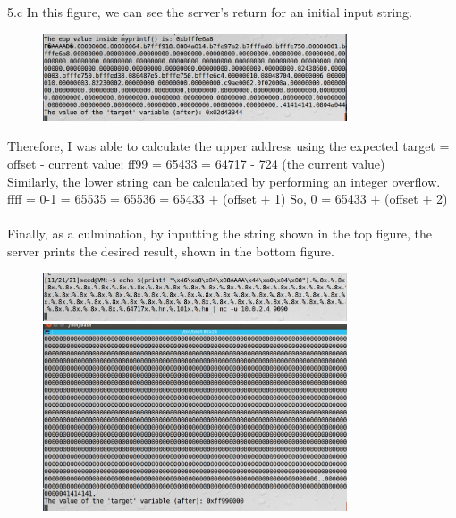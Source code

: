 \documentclass[12pt, a4paper]{article}
\begin{document}
\noindent
5.c
In this figure, we can see the server's return for an initial input string.
\begin{figure}[h!]
\centering
\includegraphics[width=90mm]{"Capture15.png"} \\
\end{figure}
Therefore, I was able to calculate the upper address using the expected target = offset - current value:
ff99 = 65433 = 64717 - 724 (the current value)\\

Similarly, the lower string can be calculated by performing an integer overflow.\\

ffff = 0-1 = 65535 = 65536 =  65433 + (offset + 1)
So, 0 = 65433 + (offset + 2) \\ \\

Finally, as a culmination, by inputting the string shown in the top figure, the server prints the desired result, shown in the bottom figure.
\begin{figure}[h!]
\centering
\includegraphics[width=90mm]{"Capture16.png"} \\
\includegraphics[width=90mm]{"Capture17.png"} \\
\end{figure}
\end{document}

